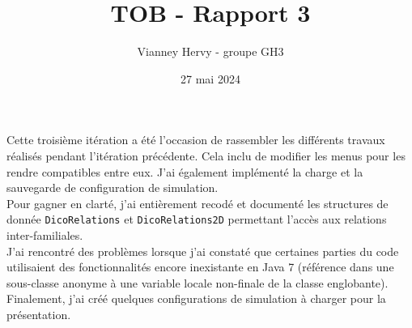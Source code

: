 \documentclass{article}
\title{TOB - Rapport 3}
\author{Vianney Hervy - groupe GH3}
\date{27 mai 2024}
\begin{document}
\maketitle

Cette troisième itération a été l'occasion de rassembler les différents travaux réalisés pendant l'itération précédente. Cela inclu de modifier les menus pour les rendre compatibles entre eux. J'ai également implémenté la charge et la sauvegarde de configuration de simulation. \\

Pour gagner en clarté, j'ai entièrement recodé et documenté les structures de donnée \texttt{DicoRelations} et \texttt{DicoRelations2D} permettant l'accès  aux relations inter-familiales. \\

J'ai rencontré des problèmes lorsque j'ai constaté que certaines parties du code utilisaient des fonctionnalités encore inexistante en Java 7 (référence dans une sous-classe anonyme à une variable locale non-finale de la classe englobante). \\

Finalement, j'ai créé quelques configurations de simulation à charger pour la présentation.
\end{document}
